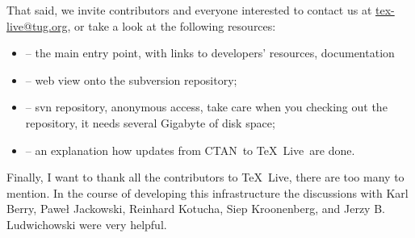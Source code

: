 \documentclass{arstexnica}
\newcommand{\tl}{\TeX~Live}
\newcommand{\ctan}{CTAN}
\begin{document}
\begin{article}
That said, we invite contributors and everyone interested to contact
us at \url{tex-live@tug.org}, or take a look at the following
resources: 
\begin{itemize}
\item {} -- the main entry point, with
  links to developers' resources, documentation
\item {} -- web view onto the
  subversion repository;
\item {} -- svn repository, anonymous
  access, take care when you checking out the repository, it needs
  several Gigabyte of disk space;
\item {} -- an
  explanation how updates from \ctan\ to \tl\ are done.
\end{itemize}

Finally, I want to thank all the contributors to \tl, there are too
many to mention. In the course of developing this infrastructure the
discussions with Karl Berry, Pawe\l{} Jackowski, Reinhard Kotucha,
Siep Kroonenberg, and Jerzy B. Ludwichowski were very helpful. 

%
%
  
\end{article}
\end{document}
